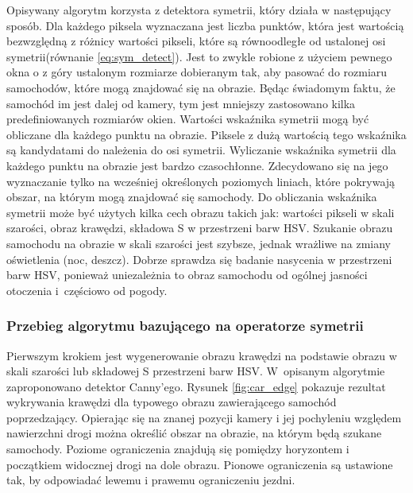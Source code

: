 Opisywany algorytm korzysta z detektora symetrii, który działa w następujący sposób. 
Dla każdego piksela wyznaczana jest liczba punktów, która jest wartością bezwzględną z różnicy wartości pikseli, które są równoodległe od ustalonej osi symetrii(równanie \ref{eq:sym_detect}). %
Jest to zwykle robione z użyciem pewnego okna o z góry ustalonym rozmiarze dobieranym tak, aby pasować do rozmiaru samochodów, które mogą znajdować się na obrazie. 
Będąc świadomym faktu, że samochód im jest dalej od kamery, tym jest mniejszy zastosowano kilka predefiniowanych rozmiarów okien. 
Wartości wskaźnika symetrii mogą być obliczane dla każdego punktu na obrazie. 
Piksele z dużą wartością tego wskaźnika są kandydatami do należenia do osi symetrii. %
Wyliczanie wskaźnika symetrii dla każdego punktu na obrazie jest bardzo czasochłonne. Zdecydowano się na jego wyznaczanie tylko na wcześniej określonych poziomych liniach, które pokrywają obszar, na którym mogą znajdować się samochody. %
Do obliczania wskaźnika symetrii może być użytych kilka cech obrazu takich jak: wartości pikseli w skali szarości, obraz krawędzi, składowa S w przestrzeni barw HSV. 
Szukanie obrazu samochodu na obrazie w skali szarości jest szybsze, jednak wrażliwe na zmiany oświetlenia (noc, deszcz). 
Dobrze sprawdza się badanie nasycenia w przestrzeni barw HSV, ponieważ uniezależnia to obraz samochodu od ogólnej jasności otoczenia i~częściowo od pogody.

\subsubsection{Przebieg algorytmu bazującego na operatorze symetrii}
Pierwszym krokiem jest wygenerowanie obrazu krawędzi na podstawie obrazu w skali szarości lub składowej S przestrzeni barw HSV. 
W~opisanym algorytmie zaproponowano detektor Canny'ego. 
Rysunek \ref{fig:car_edge} pokazuje rezultat wykrywania krawędzi dla typowego obrazu zawierającego samochód poprzedzający. 
Opierając się na znanej pozycji kamery i jej pochyleniu względem nawierzchni drogi można określić obszar na obrazie, na którym będą szukane samochody. 
Poziome ograniczenia znajdują się pomiędzy horyzontem i początkiem widocznej drogi na dole obrazu. 
Pionowe ograniczenia są ustawione tak, by odpowiadać lewemu i prawemu ograniczeniu jezdni. 

